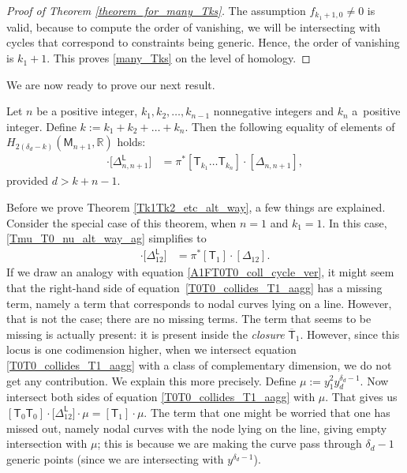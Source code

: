 \begin{proof}[Proof of Theorem \ref{theorem_for_many_Tks}]
The assumption $f_{k_1+1, 0} \neq 0$ is valid, because
to compute the order of vanishing, we will be intersecting with
cycles that correspond to constraints being generic. Hence, the order of vanishing is $k_1+1$.
This proves \eqref{many_Tks} on the level of homology.
\end{proof}

We are now ready to prove our next result.

\begin{thm}
\label{Tk1Tk2_etc_alt_way}
Let $n$ be a positive integer, $k_1, k_2,\dots, k_{n-1}$ nonnegative integers
and $k_n$ a~positive integer.
Define
$
k :=  k_1+k_2+\dots +k_n$.
Then the following equality of elements of $H_{2(\delta_d-k)}(\mathsf{M}_{n+1}, {\mathbb R})$ holds:
\begin{align}
[\mathsf{T}_{k_1} \dots \mathsf{T}_{k_{n-1}} \mathsf{T}_{k_n-1} \mathsf{T}_0] \cdot \bigl[\Delta_{n, {n+1}}^{\mathsf{L}}\bigr] & =
\pi^*[\mathsf{T}_{k_1} \dots \mathsf{T}_{k_n}] \cdot [\Delta_{n, n+1}],
\label{Tmu_T0_nu_alt_way_ag}
\end{align}
provided $d > k+n-1$.
\end{thm}

Before we prove Theorem \ref{Tk1Tk2_etc_alt_way}, a few things are explained.
Consider the special case of this theorem, when $n = 1$ and $k_1 = 1$.
In this case, \eqref{Tmu_T0_nu_alt_way_ag} simplifies to
\begin{align}
[\mathsf{T}_0 \mathsf{T}_0] \cdot \bigl[\Delta^{\mathsf{L}}_{12}\bigr] &  =  \pi^*[\mathsf{T}_1]\cdot [\Delta_{12}].
\label{T0T0_collides_T1_aagg}
\end{align}
If we draw an analogy with equation \eqref{A1FT0T0_coll_cycle_ver},
it might seem that the right-hand side
of equation~\eqref{T0T0_collides_T1_aagg}
has a missing term, namely
a term that corresponds to nodal curves lying
on a line. However, that is not the case; there are no missing terms.
The term that seems to be missing is actually present: it is present
inside the \emph{closure} $\overline{\mathsf{T}}_1$. However, since this locus
is one codimension higher, when we intersect
equation \eqref{T0T0_collides_T1_aagg} with a class of complementary dimension, we do not get
any contribution. We explain this more precisely. Define
$\mu := y_1^{2} y_d^{\delta_d-1}$. Now intersect both sides of
equation \eqref{T0T0_collides_T1_aagg} with $\mu$. That gives us
$[\mathsf{T}_0 \mathsf{T}_0] \cdot \bigl[\Delta^{\mathsf{L}}_{12}\bigr]\cdot \mu  =
[\mathsf{T}_1]\cdot \mu$.
The term that one might be worried that one has missed out, namely nodal curves
with the node lying on the line, giving empty intersection with $\mu$; this is
because we are making the curve pass through $\delta_d-1$ generic points \big(since we
are intersecting with $y^{\delta_d-1}$\big).

